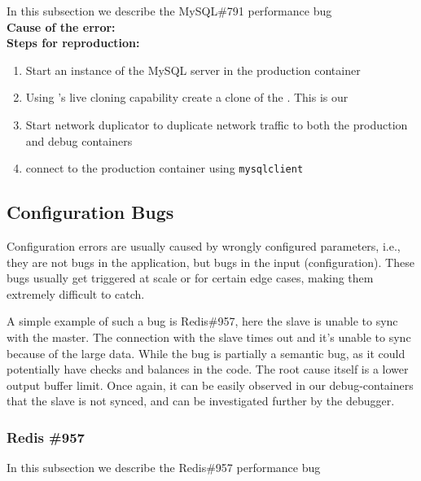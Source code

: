 In this subsection we describe the MySQL\#791 performance bug \\

\noindent \textbf{Cause of the error:} \\

\noindent \textbf{Steps for reproduction:} \\

\begin{adjustwidth}{0.5cm}{}
	\begin{enumerate}
		\item Start an instance of the MySQL server in the production container
		\item Using \parikshan's live cloning capability create a clone of the \productioncontainer. This is our \debugcontainer
		\item Start network duplicator to duplicate network traffic to both the production and debug containers
		\item connect to the production container using \texttt{mysqlclient}
	\end{enumerate}
\end{adjustwidth}	


\subsection{Configuration Bugs}
Configuration errors are usually caused by wrongly configured parameters, i.e., they are not bugs in the application, but bugs in the input (configuration).
These bugs usually get triggered at scale or for certain edge cases, making them extremely difficult to catch.

A simple example of such a bug is Redis\#957, here the slave is unable to sync with the master.
The connection with the slave times out and it's unable to sync because of the large data.
While the bug is partially a semantic bug, as it could potentially have checks and balances in the code. 
The root cause itself is a lower output buffer limit.
Once again, it can be easily observed in our debug-containers that the slave is not synced, and can be investigated further by the debugger.

\subsubsection{Redis \#957}

In this subsection we describe the Redis\#957 performance bug \\

